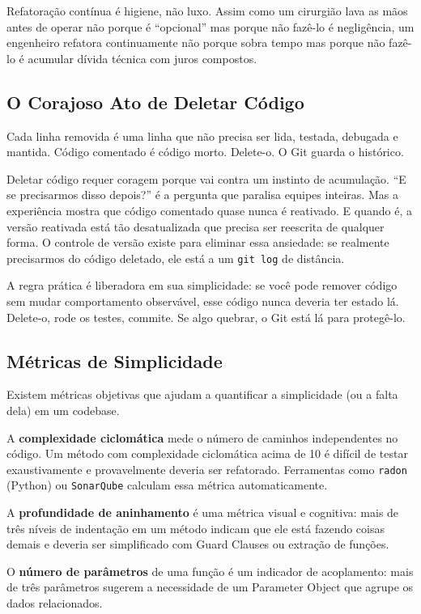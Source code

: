 Refatoração contínua é higiene, não luxo. Assim como um cirurgião lava as
mãos antes de operar não porque é ``opcional'' mas porque não fazê-lo é
negligência, um engenheiro refatora continuamente não porque sobra tempo mas
porque não fazê-lo é acumular dívida técnica com juros compostos.

\subsection{O Corajoso Ato de Deletar Código}

Cada linha removida é uma linha que não precisa ser lida, testada, debugada e
mantida. Código comentado é código morto. Delete-o. O Git guarda o histórico.

Deletar código requer coragem porque vai contra um instinto de
acumulação. ``E se precisarmos disso depois?'' é a pergunta que paralisa
equipes inteiras. Mas a experiência mostra que código comentado quase nunca é
reativado. E quando é, a versão reativada está tão desatualizada que precisa
ser reescrita de qualquer forma. O controle de versão existe para
eliminar essa ansiedade: se realmente precisarmos do código deletado,
ele está a um \texttt{git log} de distância.

A regra prática é liberadora em sua simplicidade: se você pode remover código
sem mudar comportamento observável, esse código nunca deveria ter estado lá.
Delete-o, rode os testes, commite. Se algo quebrar, o Git está lá para
protegê-lo.

\subsection{Métricas de Simplicidade}

Existem métricas objetivas que ajudam a quantificar a simplicidade (ou a
falta dela) em um codebase.

A \textbf{complexidade ciclomática} mede o número de caminhos independentes
no código. Um método com complexidade ciclomática acima de 10 é difícil de
testar exaustivamente e provavelmente deveria ser refatorado. Ferramentas
como \texttt{radon} (Python) ou \texttt{SonarQube} calculam essa métrica
automaticamente.

A \textbf{profundidade de aninhamento} é uma métrica visual e cognitiva:
mais de três níveis de indentação em um método indicam que ele está fazendo
coisas demais e deveria ser simplificado com Guard Clauses ou extração de
funções.

O \textbf{número de parâmetros} de uma função é um indicador de
acoplamento: mais de três parâmetros sugerem a necessidade de um Parameter
Object que agrupe os dados relacionados.

